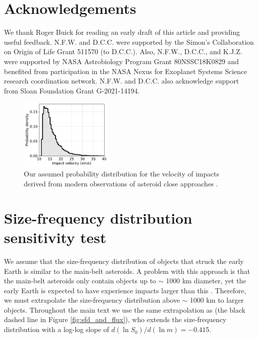 \documentclass[manuscript]{aastex63}
\begin{document}
\section*{Acknowledgements}

We thank Roger Buick for reading an early draft of this article and providing useful feedback. N.F.W. and D.C.C. were supported by the Simon's Collaboration on Origin of Life Grant 511570 (to D.C.C.). Also, N.F.W., D.C.C., and K.J.Z. were supported by NASA Astrobiology Program Grant 80NSSC18K0829 and benefited from participation in the NASA Nexus for Exoplanet Systems Science research coordination network. N.F.W. and D.C.C. also acknowledge support from Sloan Foundation Grant G-2021-14194.

\appendix

\renewcommand{\thefigure}{A\arabic{figure}}
\renewcommand{\thetable}{A\arabic{table}}
\setcounter{figure}{0}
\setcounter{table}{0}

\begin{figure}
  \centering
  \includegraphics[width=0.4\textwidth]{figures/velocity_distribution.pdf}
  \caption{Our assumed probability distribution for the velocity of impacts derived from modern observations of asteroid close approaches \citep{Park_2023}.}
  \label{fig:velocity_distribution}
\end{figure}

\section{Size-frequency distribution sensitivity test} \label{sec:append_sfd}

We assume that the size-frequency distribution of objects that struck the early Earth is similar to the main-belt asteroids. A problem with this approach is that the main-belt asteroids only contain objects up to $\sim$ 1000 km diameter, yet the early Earth is expected to have experience impacts larger than this \citep{Marchi_2014}. Therefore, we must extrapolate the size-frequency distribution above $\sim$ 1000 km to larger objects. Throughout the main text we use the same extrapolation as \citet{Marchi_2014} (the black dashed line in Figure \ref{fig:sfd_and_flux}), who extends the size-frequency distribution with a log-log slope of $d (\ln S_0)/d (\ln m) = - 0.415$.
\end{document}
